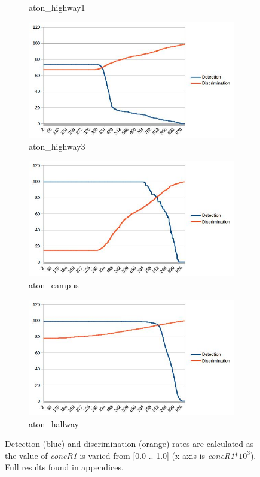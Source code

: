 \begin{figure}
\begin{subfigure}{.49\linewidth}
  \caption{aton\_highway1}
\end{subfigure}
\hfill
\begin{subfigure}{.49\linewidth}
  \includegraphics[width=1\linewidth]{figures/highway3_coneR1_response.jpg}
  \caption{aton\_highway3}
\end{subfigure}
\hfill
\begin{subfigure}{.49\linewidth}
  \includegraphics[width=1\linewidth]{figures/campus_coneR1_response.jpg}
  \caption{aton\_campus}
\end{subfigure}
\hfill
\begin{subfigure}{.49\linewidth}
  \includegraphics[width=1\linewidth]{figures/hallway_coneR1_response.jpg}
  \caption{aton\_hallway}
\end{subfigure}

\caption{Detection (blue) and discrimination (orange) rates are calculated as the value of \textit{coneR1} is varied from [0.0 .. 1.0] (x-axis is \textit{coneR1}$*10^{3}$). Full results found in appendices.}
\label{fig:coneR1_iterate}
\end{figure}


